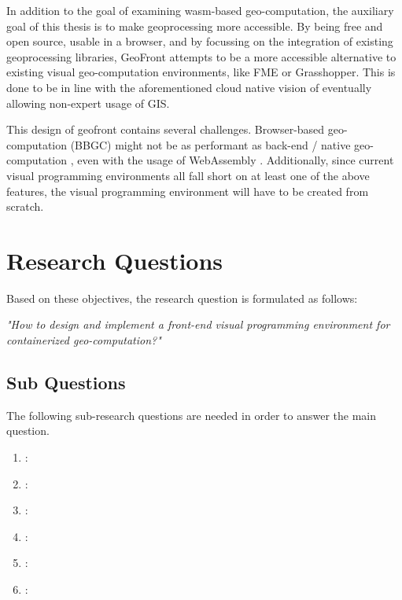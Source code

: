 In addition to the goal of examining wasm-based geo-computation, the auxiliary goal of this thesis is to make geoprocessing more accessible. 
By being free and open source, usable in a browser, and by focussing on the integration of existing geoprocessing libraries, GeoFront attempts to be a more accessible alternative to existing visual geo-computation environments, like FME or Grasshopper. 
This is done to be in line with the aforementioned cloud native vision of eventually allowing non-expert usage of GIS.

This design of geofront contains several challenges. Browser-based geo-computation (BBGC) might not be as performant as back-end / native geo-computation \cite{panidi_hybrid_2015, hamilton_client-side_2014}, even with the usage of WebAssembly \cite{jangda_not_2019}. 
Additionally, since current visual programming environments all fall short on at least one of the above features, the visual programming environment will have to be created from scratch.

\newpage
\section{Research Questions}
Based on these objectives, the research question is formulated as follows: 

\textit{"How to design and implement a front-end visual programming environment for containerized geo-computation?"}

\subsection*{Sub Questions}
The following sub-research questions are needed in order to answer the main question. 

\begin{enumerate}[a]
  \item {}: 
  \item {}: 
  \item {}: 
  \item {}: 
  \item {}:   
  \item {}:  
\end{enumerate}

